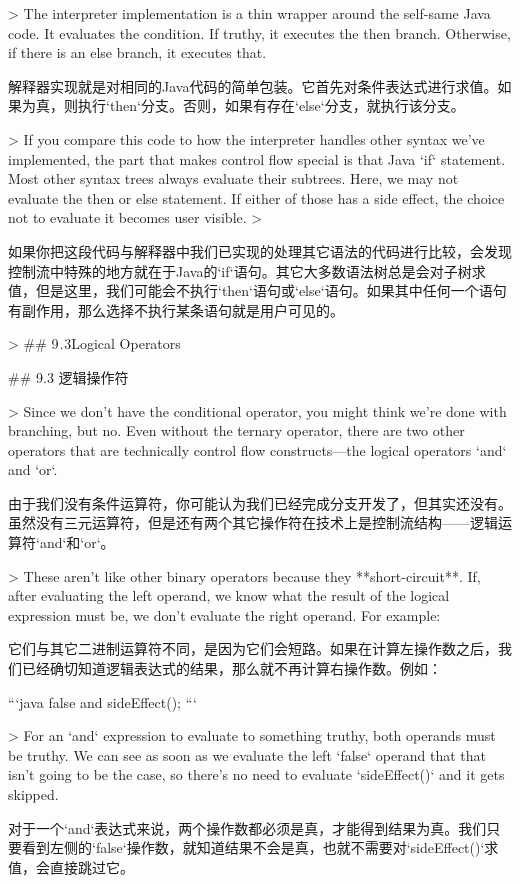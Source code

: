 \documentclass[cn,11pt,chinese]{elegantbook}
\begin{document}
{{> The interpreter implementation is a thin wrapper around the self-same Java code. It evaluates the condition. If truthy, it executes the then branch. Otherwise, if there is an else branch, it executes that.

解释器实现就是对相同的Java代码的简单包装。它首先对条件表达式进行求值。如果为真，则执行`then`分支。否则，如果有存在`else`分支，就执行该分支。

> If you compare this code to how the interpreter handles other syntax we’ve implemented, the part that makes control flow special is that Java `if` statement. Most other syntax trees always evaluate their subtrees. Here, we may not evaluate the then or else statement. If either of those has a side effect, the choice not to evaluate it becomes user visible.
>

如果你把这段代码与解释器中我们已实现的处理其它语法的代码进行比较，会发现控制流中特殊的地方就在于Java的`if`语句。其它大多数语法树总是会对子树求值，但是这里，我们可能会不执行`then`语句或`else`语句。如果其中任何一个语句有副作用，那么选择不执行某条语句就是用户可见的。

> ## 9 . 3Logical Operators

## 9.3 逻辑操作符

> Since we don’t have the conditional operator, you might think we’re done with branching, but no. Even without the ternary operator, there are two other operators that are technically control flow constructs—the logical operators `and` and `or`.

由于我们没有条件运算符，你可能认为我们已经完成分支开发了，但其实还没有。虽然没有三元运算符，但是还有两个其它操作符在技术上是控制流结构——逻辑运算符`and`和`or`。

> These aren’t like other binary operators because they **short-circuit**. If, after evaluating the left operand, we know what the result of the logical expression must be, we don’t evaluate the right operand. For example:

它们与其它二进制运算符不同，是因为它们会短路。如果在计算左操作数之后，我们已经确切知道逻辑表达式的结果，那么就不再计算右操作数。例如：

```java
false and sideEffect();
```

> For an `and` expression to evaluate to something truthy, both operands must be truthy. We can see as soon as we evaluate the left `false` operand that that isn’t going to be the case, so there’s no need to evaluate `sideEffect()` and it gets skipped.

对于一个`and`表达式来说，两个操作数都必须是真，才能得到结果为真。我们只要看到左侧的`false`操作数，就知道结果不会是真，也就不需要对`sideEffect()`求值，会直接跳过它。

}}
\end{document}
